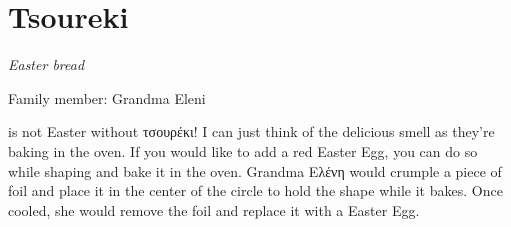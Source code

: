 \chapter{Tsoureki}
\label{ch:tsoureki}
\textit{Easter bread}

Family member: Grandma Eleni


\newthought{} is not Easter without \textgreek{τσουρέκι}! I can just think of the delicious smell as they're baking in the oven. If you would like to add a red Easter Egg, you can do so while shaping and bake it in the oven. Grandma \textgreek{Ελένη} would crumple a piece of foil and place it in the center of the circle to hold the shape while it bakes. Once cooled, she would remove the foil and replace it with a Easter Egg.

